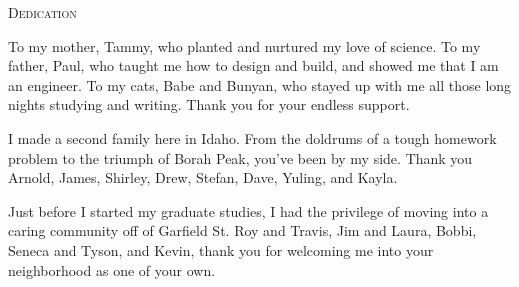 \vspace*{\fill}
\begin{center}
{\LARGE\textsc{Dedication}}\vspace{0.5cm}

To my mother, Tammy, who planted and nurtured my love of science. To my father, Paul, who taught me how to design and build, and showed me that I am an engineer. To my cats, Babe and Bunyan, who stayed up with me all those long nights studying and writing. Thank you for your endless support.

\vspace{\baselineskip}

I made a second family here in Idaho. From the doldrums of a tough homework problem to the triumph of Borah Peak, you've been by my side. Thank you Arnold, James, Shirley, Drew, Stefan, Dave, Yuling, and Kayla.

\vspace{\baselineskip}

Just before I started my graduate studies, I had the privilege of moving into a caring community off of Garfield St. Roy and Travis, Jim and Laura, Bobbi, Seneca and Tyson, and Kevin, thank you for welcoming me into your neighborhood as one of your own.

\end{center}
\vspace{\fill}
